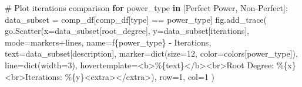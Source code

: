 \documentclass[
  letterpaper,
  DIV=11,
  numbers=noendperiod]{scrartcl}
\newenvironment{Shaded}{\begin{snugshade}}{\end{snugshade}}
\newcommand{\BuiltInTok}[1]{\textcolor[rgb]{0.00,0.23,0.31}{#1}}
\newcommand{\CommentTok}[1]{\textcolor[rgb]{0.37,0.37,0.37}{#1}}
\newcommand{\ControlFlowTok}[1]{\textcolor[rgb]{0.00,0.23,0.31}{\textbf{#1}}}
\newcommand{\DecValTok}[1]{\textcolor[rgb]{0.68,0.00,0.00}{#1}}
\newcommand{\KeywordTok}[1]{\textcolor[rgb]{0.00,0.23,0.31}{\textbf{#1}}}
\newcommand{\NormalTok}[1]{\textcolor[rgb]{0.00,0.23,0.31}{#1}}
\newcommand{\OperatorTok}[1]{\textcolor[rgb]{0.37,0.37,0.37}{#1}}
\newcommand{\SpecialCharTok}[1]{\textcolor[rgb]{0.37,0.37,0.37}{#1}}
\newcommand{\SpecialStringTok}[1]{\textcolor[rgb]{0.13,0.47,0.30}{#1}}
\newcommand{\StringTok}[1]{\textcolor[rgb]{0.13,0.47,0.30}{#1}}
\begin{document}
\begin{Shaded}
\begin{Highlighting}[]
\CommentTok{\# Plot iterations comparison}
\ControlFlowTok{for}\NormalTok{ power\_type }\KeywordTok{in}\NormalTok{ [}\StringTok{\textquotesingle{}Perfect Power\textquotesingle{}}\NormalTok{, }\StringTok{\textquotesingle{}Non{-}Perfect\textquotesingle{}}\NormalTok{]:}
\NormalTok{    data\_subset }\OperatorTok{=}\NormalTok{ comp\_df[comp\_df[}\StringTok{\textquotesingle{}type\textquotesingle{}}\NormalTok{] }\OperatorTok{==}\NormalTok{ power\_type]}
\NormalTok{    fig.add\_trace(}
\NormalTok{        go.Scatter(x}\OperatorTok{=}\NormalTok{data\_subset[}\StringTok{\textquotesingle{}root\_degree\textquotesingle{}}\NormalTok{], y}\OperatorTok{=}\NormalTok{data\_subset[}\StringTok{\textquotesingle{}iterations\textquotesingle{}}\NormalTok{],}
\NormalTok{                   mode}\OperatorTok{=}\StringTok{\textquotesingle{}markers+lines\textquotesingle{}}\NormalTok{,}
\NormalTok{                   name}\OperatorTok{=}\SpecialStringTok{f\textquotesingle{}}\SpecialCharTok{\{}\NormalTok{power\_type}\SpecialCharTok{\}}\SpecialStringTok{ {-} Iterations\textquotesingle{}}\NormalTok{,}
\NormalTok{                   text}\OperatorTok{=}\NormalTok{data\_subset[}\StringTok{\textquotesingle{}description\textquotesingle{}}\NormalTok{],}
\NormalTok{                   marker}\OperatorTok{=}\BuiltInTok{dict}\NormalTok{(size}\OperatorTok{=}\DecValTok{12}\NormalTok{, color}\OperatorTok{=}\NormalTok{colors[power\_type]),}
\NormalTok{                   line}\OperatorTok{=}\BuiltInTok{dict}\NormalTok{(width}\OperatorTok{=}\DecValTok{3}\NormalTok{),}
\NormalTok{                   hovertemplate}\OperatorTok{=}\StringTok{\textquotesingle{}\textless{}b\textgreater{}\%}\SpecialCharTok{\{text\}}\StringTok{\textless{}/b\textgreater{}\textless{}br\textgreater{}Root Degree: \%}\SpecialCharTok{\{x\}}\StringTok{\textless{}br\textgreater{}Iterations: \%}\SpecialCharTok{\{y\}}\StringTok{\textless{}extra\textgreater{}\textless{}/extra\textgreater{}\textquotesingle{}}\NormalTok{),}
\NormalTok{        row}\OperatorTok{=}\DecValTok{1}\NormalTok{, col}\OperatorTok{=}\DecValTok{1}
\NormalTok{    )}


\end{Highlighting}
\end{Shaded}
\end{document}
